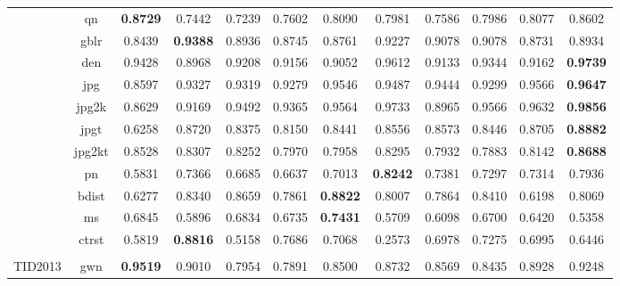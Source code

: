 \documentclass[11pt,a4paper]{article}
\begin{document}
\begin{table}[!htb]
\begin{scriptsize}
{\begin{threeparttable}
\begin{tabular}{*{12}{c}}
& qn & \textbf{0.8729} & \cellcolor{green!25}0.7442 & \cellcolor{green!25}0.7239 & \cellcolor{green!25}0.7602 & 0.8090 & 0.7981 & \cellcolor{green!25}0.7586 & 0.7986 & 0.8077 & 0.8602\\
& gblr & 0.8439 & \cellcolor{red!25}\textbf{0.9388} & 0.8936 & 0.8745 & 0.8761 & 0.9227 & 0.9078 & 0.9078 & 0.8731 & 0.8934\\
& den & \cellcolor{green!25}0.9428 & \cellcolor{green!25}0.8968 & \cellcolor{green!25}0.9208 & \cellcolor{green!25}0.9156 & \cellcolor{green!25}0.9052 & 0.9612 & \cellcolor{green!25}0.9133 & \cellcolor{green!25}0.9344 & \cellcolor{green!25}0.9162 & \textbf{0.9739}\\
& jpg & \cellcolor{green!25}0.8597 & \cellcolor{green!25}0.9327 & \cellcolor{green!25}0.9319 & \cellcolor{green!25}0.9279 & 0.9546 & 0.9487 & 0.9444 & \cellcolor{green!25}0.9299 & 0.9566 & \textbf{0.9647}\\
& jpg2k & \cellcolor{green!25}0.8629 & \cellcolor{green!25}0.9169 & \cellcolor{green!25}0.9492 & \cellcolor{green!25}0.9365 & \cellcolor{green!25}0.9564 & \cellcolor{green!25}0.9733 & \cellcolor{green!25}0.8965 & \cellcolor{green!25}0.9566 & \cellcolor{green!25}0.9632 & \textbf{0.9856}\\
& jpgt & \cellcolor{green!25}0.6258 & 0.8720 & 0.8375 & 0.8150 & 0.8441 & 0.8556 & 0.8573 & 0.8446 & 0.8705 & \textbf{0.8882}\\
& jpg2kt & 0.8528 & 0.8307 & 0.8252 & 0.7970 & 0.7958 & 0.8295 & 0.7932 & 0.7883 & 0.8142 & \textbf{0.8688}\\
& pn & \cellcolor{green!25}0.5831 & 0.7366 & 0.6685 & \cellcolor{green!25}0.6637 & 0.7013 & \textbf{0.8242} & 0.7381 & 0.7297 & 0.7314 & 0.7936\\
& bdist & \cellcolor{green!25}0.6277 & 0.8340 & 0.8659 & 0.7861 & \textbf{0.8822} & 0.8007 & 0.7864 & 0.8410 & \cellcolor{green!25}0.6198 & 0.8069\\
& ms & 0.6845 & 0.5896 & 0.6834 & 0.6735 & \cellcolor{red!25}\textbf{0.7431} & 0.5709 & 0.6098 & 0.6700 & 0.6420 & 0.5358\\
& ctrst & 0.5819 & \cellcolor{red!25}\textbf{0.8816} & 0.5158 & 0.7686 & 0.7068 & \cellcolor{green!25}0.2573 & 0.6978 & 0.7275 & 0.6995 & 0.6446\\
\\
\multirow{24}{*}{TID2013} & gwn & \textbf{0.9519} & 0.9010 & \cellcolor{green!25}0.7954 & \cellcolor{green!25}0.7891 & \cellcolor{green!25}0.8500 & \cellcolor{green!25}0.8732 & \cellcolor{green!25}0.8569 & \cellcolor{green!25}0.8435 & 0.8928 & 0.9248\\

\end{tabular}
\end{threeparttable}}
\end{scriptsize}
\end{table}
\end{document}
